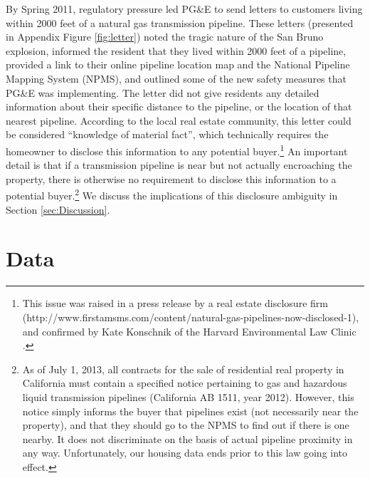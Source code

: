 \documentclass[12pt]{article}
\begin{document}
By Spring 2011, regulatory pressure led PG\&E to send letters to customers
living within 2000 feet of a natural gas transmission pipeline. These
letters (presented in Appendix Figure \ref{fig:letter}) noted the
tragic nature of the San Bruno explosion, informed the resident that
they lived within 2000 feet of a pipeline, provided a link to their
online pipeline location map and the National Pipeline Mapping System
(NPMS), and outlined some of the new safety measures that PG\&E was
implementing. The letter did not give residents any detailed information
about their specific distance to the pipeline, or the location of
that nearest pipeline. According to the local real estate community,
this letter could be considered ``knowledge of material fact'',
which technically requires the homeowner to disclose this information
to any potential buyer.\footnote{This issue was raised in a press release by a real estate disclosure
firm (http://www.firstamsms.com/content/natural-gas-pipelines-now-disclosed-1),
and confirmed by Kate Konschnik of the Harvard Environmental Law Clinic
\citep{kate_konschnik_personal_2016}.} An important detail is that if a transmission pipeline is near \textendash{}
but not actually encroaching \textendash{} the property, there is
otherwise no requirement to disclose this information to a potential
buyer.\footnote{As of July 1, 2013, all contracts for the sale of residential real
property in California must contain a specified notice pertaining
to gas and hazardous liquid transmission pipelines (California AB
1511, year 2012). However, this notice simply informs the buyer that
pipelines exist (not necessarily near the property), and that they
should go to the NPMS to find out if there is one nearby. It does
not discriminate on the basis of actual pipeline proximity in any
way. Unfortunately, our housing data ends prior to this law going
into effect.} We discuss the implications of this disclosure ambiguity in Section
\ref{sec:Discussion}.

\section{Data\label{sec:Data}}
\end{document}
